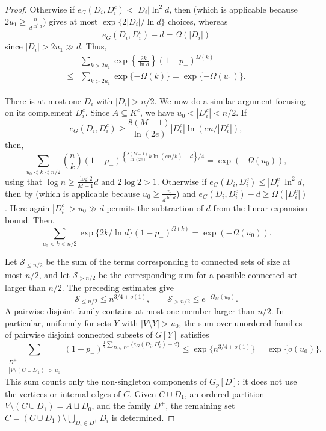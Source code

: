 \documentclass[10pt,a4paper]{amsart}
\begin{document}
\begin{proof}
Otherwise if $e_G(D_i, D_i^c)<|D_i|\ln^2 d$, then  (which is applicable because $2u_1 \geq \frac{n}{d^{\ln^2 d}}$) gives at most $\exp\{2|D_i|/\ln d\}$ choices, whereas
\[
 e_G(D_i, D_i^c)-d = \Omega(|D_i|)
\]
since $|D_i|>2u_1 \gg d$. Thus,
\begin{align*}
    &\sum_{k > 2u_1} \exp\left\{ \frac{2k}{\ln d}\right\} (1-p_-)^{\Omega(k)}\\
    \leq & \sum_{k > 2u_1} \exp\{-\Omega(k)\} = \exp\{-\Omega(u_1)\}.
\end{align*}

There is at most one $D_i$ with $|D_i|>n/2$. We now do a similar argument focusing on its complement $D_i^c$. Since $A\subseteq K^c$, we have $u_0<|D_i^c|<n/2$.
If
\[
 e_G(D_i, D_i^c)\ge \frac{8(M-1)}{\ln(2e)}|D_i^c|\ln(en/|D_i^c|),
\]
then,
\[
 \sum_{u_0<k<n/2}\binom nk (1-p_-)^{\left\{\frac{8(M-1)}{\ln(2e)} k\ln(en/k)-d\right\}/4} =\exp(-\Omega(u_0)),
\]
using that $\log n \geq \frac{\log 2}{M-1} d$ and $2 \log 2>1$.
Otherwise if $e_G(D_i, D_i^c)\le |D_i^c|\ln^2d$, then by  (which is applicable because $u_0 \geq \frac{n}{d^{\ln^2 d}}$) and $e_G(D_i, D_i^c)-d\ge \Omega(|D_i^c|)$. Here again $|D_i^c|>u_0\gg d$ permits the subtraction of $d$ from the linear expansion bound. Then,
\[
\sum_{u_0<k<n/2}\exp\{2k/\ln d\}(1-p_-)^{\Omega(k)}=\exp(-\Omega(u_0)).
\]

Let $\mathcal{S}_{\le n/2}$ be the sum of the terms corresponding to connected sets of size at most $n/2$, and let $\mathcal{S}_{>n/2}$ be the corresponding sum for a possible connected set larger than $n/2$.
The preceding estimates give
\[
 \mathcal{S}_{\le n/2}\le n^{3/4+o(1)},
 \qquad
 \mathcal{S}_{>n/2}\le e^{-\Omega_M(u_0)}.
\]
A pairwise disjoint family contains at most one member larger than $n/2$.
In particular, uniformly for sets $Y$ with $|V\setminus Y|>u_0$, the sum over unordered families of pairwise disjoint connected subsets of $G[Y]$ satisfies
\begin{equation}\label{eq:component-family-sum}
 \sum_{\substack{D^+\\|V\setminus (C \cup D_1)|>u_0}}
 (1-p_-)^{\frac14\sum_{D_i\in D^+}\{e_G(D_i, D_i^c)-d\}}
 \le\exp\{n^{3/4+o(1)}\}
 =\exp\{o(u_0)\}.
\end{equation}
This sum counts only the non-singleton components of $G_p[D]$; it does not use the vertices or internal edges of $C$. Given $C \cup D_1$, an ordered partition $V\setminus (C \cup D_1)=A\sqcup D_0$, and the family $D^+$, the remaining set
$C=(C \cup D_1)\setminus\bigcup_{D_i\in D^+}D_i$ is determined.


\end{proof}
\end{document}
